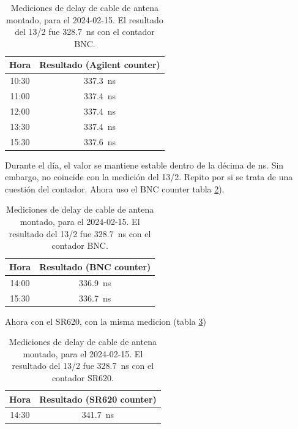 \documentclass[11pt]{article}
\begin{document}
\begin{table}[ht]
    \centering
    \begin{tabular}{|c||c|}
        \hline
        Hora & Resultado (Agilent counter)\\
        \hline
        10:30 & \SI{337.3}{\nano\second} \\
        11:00 & \SI{337.4}{\nano\second}\\
        12:00 & \SI{337.4}{\nano\second}\\
        13:30 & \SI{337.4}{\nano\second}\\
        15:30 & \SI{337.6}{\nano\second}\\
        \hline
    \end{tabular}
    \caption{Mediciones de delay de cable de antena montado, para el 2024-02-15. El resultado del 13/2 fue \SI{328.7}{\nano\second} con el contador BNC. }
    \label{tab:my_label}
\end{table}

Durante el día, el valor se mantiene estable dentro de la décima de ns. Sin embargo, no coincide con la medición del 13/2. Repito por si se trata de una cuestión del contador. Ahora uso el BNC counter tabla \ref{tab:delayconBNC}).

\begin{table}[ht]
    \centering
    \begin{tabular}{|c||c|}
        \hline
        Hora & Resultado (BNC counter)\\
        \hline
        14:00 & \SI{336.9}{\nano\second} \\
        15:30 & \SI{336.7}{\nano\second} \\
        \hline
    \end{tabular}
    \caption{Mediciones de delay de cable de antena montado, para el 2024-02-15. El resultado del 13/2 fue \SI{328.7}{\nano\second} con el contador BNC.  }
    \label{tab:delayconBNC}
\end{table}

Ahora con el SR620, con la misma medicion (tabla \ref{tab:delayconSR620})


\begin{table}[ht]
    \centering
    \begin{tabular}{|c||c|}
        \hline
        Hora & Resultado (SR620 counter)\\
        \hline
        14:30 & \SI{341.7}{\nano\second} \\
        \hline
    \end{tabular}
    \caption{Mediciones de delay de cable de antena montado, para el 2024-02-15. El resultado del 13/2 fue \SI{328.7}{\nano\second} con el contador SR620.  }
    \label{tab:delayconSR620}
\end{table}
\end{document}
